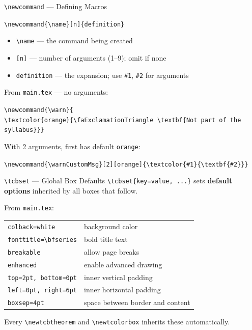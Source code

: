 \blueheader
\begin{frame}{\texttt{\textbackslash newcommand} --- Defining Macros}
\begin{bluefocus}
\texttt{\textbackslash newcommand\{\textbackslash name\}[n]\{definition\}}
\end{bluefocus}
\begin{itemize}
  \item \texttt{\textbackslash name} --- the command being created
  \item \texttt{[n]} --- number of arguments (1--9); omit if none
  \item \texttt{definition} --- the expansion; use \texttt{\#1}, \texttt{\#2} for arguments
\end{itemize}
\medskip
From \texttt{main.tex} --- no arguments:
\begin{bluefocus}
\small\texttt{\textbackslash newcommand\{\textbackslash warn\}\{}\\\texttt{\quad\textbackslash textcolor\{orange\}\{\textbackslash faExclamationTriangle\ \textbackslash textbf\{Not part of the syllabus\}\}\}}
\end{bluefocus}
With 2 arguments, first has default \texttt{orange}:
\begin{bluefocus}
\small\texttt{\textbackslash newcommand\{\textbackslash warnCustomMsg\}[2][orange]\{\textbackslash textcolor\{\#1\}\{\textbackslash textbf\{\#2\}\}\}}
\end{bluefocus}
\end{frame}

\blueheader
\begin{frame}{\texttt{\textbackslash tcbset} --- Global Box Defaults}
\texttt{\textbackslash tcbset\{key=value, ...\}} sets \textbf{default options} inherited by all boxes that follow.
\medskip

From \texttt{main.tex}:
\begin{bluefocus}
\small
\begin{tabular}{@{}ll@{}}
\texttt{colback=white} & background color\\
\texttt{fonttitle=\textbackslash bfseries} & bold title text\\
\texttt{breakable} & allow page breaks\\
\texttt{enhanced} & enable advanced drawing\\
\texttt{top=2pt, bottom=0pt} & inner vertical padding\\
\texttt{left=0pt, right=6pt} & inner horizontal padding\\
\texttt{boxsep=4pt} & space between border and content\\
\end{tabular}
\end{bluefocus}
\medskip
Every \texttt{\textbackslash newtcbtheorem} and \texttt{\textbackslash newtcolorbox} inherits these automatically.
\end{frame}

